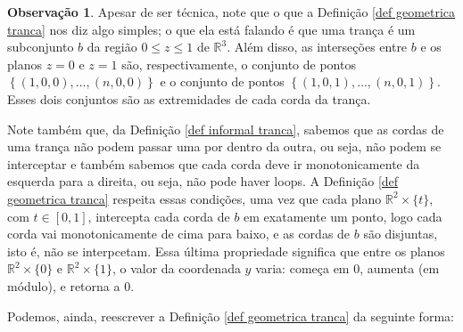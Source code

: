 \documentclass[a4paper,portuguese,11pt,twoside, leqno]{book}
\theoremstyle{definition}
\newtheorem{remark}{Observação}[section]
\begin{document}
	\begin{remark}
		Apesar de ser técnica, note que o que a Definição \eqref{def geometrica tranca} nos diz algo simples; o que ela está falando é que uma trança é um subconjunto $b$ da região $0\leq z\leq 1 $ de $\mathbb{R}^3$. Além disso, as interseções entre $b$ e os planos $z = 0$ e $z = 1$ são, respectivamente, o conjunto de pontos $\left\{  (1,0,0), \dots, (n,0,0)\right\}$ e o conjunto de pontos $\left\{ (1,0,1), \dots, (n,0,1) \right\}$. Esses dois conjuntos são as extremidades de cada corda da trança.
		
		\par\vspace{0.3cm} Note também que, da Definição \eqref{def informal tranca}, sabemos que as cordas de uma trança não podem passar uma por dentro da outra, ou seja, não podem se interceptar e também sabemos que cada corda deve ir monotonicamente da esquerda para a direita, ou seja, não pode haver loops. A Definição \eqref{def geometrica tranca} respeita essas condições, uma vez que cada plano $\mathbb{R}^2\times\{t\}$, com $t\in [0,1]$, intercepta cada corda de $b$ em exatamente um ponto, logo cada corda vai monotonicamente de cima para baixo, e as cordas de $b$ são disjuntas, isto é, não se interpcetam. Essa última propriedade significa que entre os planos $\mathbb{R}^2\times \{0\}$ e $\mathbb{R}^2\times \{1\}$, o valor da coordenada $y$ varia: começa em $0$, aumenta (em módulo), e retorna a $0$.
	\end{remark}
	
	\par\vspace{0.3cm} Podemos, ainda, reescrever a Definição \eqref{def geometrica tranca} da seguinte forma:
	
\end{document}
